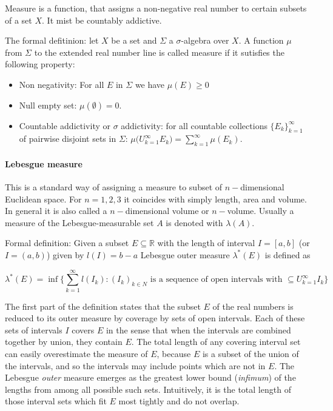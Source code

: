 Measure is a function, that assigns a non-negative real number to certain subsets of a set $X$. It mist be countably addictive. 

The formal defitinion: 
let $X$ be a set and $\Sigma$ a $\sigma$-algebra over $X$. A function $\mu$ from $\Sigma$ to the extended real number line is called measure if it sutisfies the following property:
\begin{itemize}
    \item Non negativity: For all $E$ in $\Sigma$ we have $\mu(E)\geq 0$
    \item Null empty set: $\mu(\emptyset) = 0$.
    \item Countable addictivity or $\sigma$ addictivity: for all countable collections $\{E_k\}_{k=1}^{\infty}$ of pairwise disjoint sets in $\Sigma$: $\mu\Big(U_{k=1}^{\infty}E_k\Big) = \sum_{k=1}^{\infty}\mu(E_k)$.
\end{itemize}

\paragraph{Lebesgue measure}

This is a standard way of assigning a measure to subset of $n-$dimensional Euclidean space. 
For $n=1,2,3$ it coincides with simply length, area and volume. 
In general it is also called a $n-$dimensional volume or $n-$volume. 
Usually a measure of the Lebesgue-measurable set $A$ is denoted with $\lambda(A)$. 

Formal definition: 
Given a subset $E\subseteq\mathbb{R}$ with the length of interval $I=[a,b]$ (or $I=(a,b)$) given by $l(I) = b-a$ Lebesgue outer measure $\lambda^*(E)$ is defined as 

\begin{equation}
\lambda^*(E) = \inf\Bigg\{\sum_{k=1}^{\infty}l(I_k):(I_k)_{k\in N} \text{ is a sequence of open intervals with } \subseteq U_{k=1}^{\infty}I_k\Bigg\}
\end{equation}

The first part of the definition states that the subset $E$ of the real numbers is reduced to its outer measure by coverage by sets of open intervals. 
Each of these sets of intervals $I$ covers $E$ in the sense that when the intervals are combined together by union, they contain $E$. 
The total length of any covering interval set can easily overestimate the measure of $E$, because $E$ is a subset of the union of the intervals, and so the intervals may include points which are not in $E$. 
The Lebesgue \textit{outer} measure emerges as the greatest lower bound (\textit{infimum}) of the lengths from among all possible such sets. 
Intuitively, it is the total length of those interval sets which fit $E$ most tightly and do not overlap.

